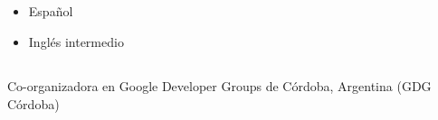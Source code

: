 \documentclass[%
               doublesided,
               paper=a4,
               fontsize=10pt
              ]{my-resume}
\begin{document}
{    
\vspace{1.0em}
\subsection{    }

 
\begin{itemize}
\item 	Español
\item 	Inglés intermedio
\end{itemize}
 
\vspace{1.0em}
\subsection{  }
 
\begin{itemize}
    
    {Co-organizadora en Google Developer Groups de Córdoba, Argentina (GDG Córdoba)}
\end{itemize}

}
\end{document}
